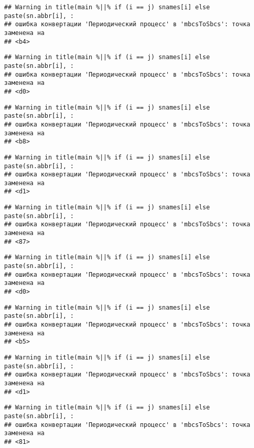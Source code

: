 \documentclass[
]{article}
\begin{document}
\begin{verbatim}
## Warning in title(main %||% if (i == j) snames[i] else paste(sn.abbr[i], :
## ошибка конвертации 'Периодический процесс' в 'mbcsToSbcs': точка заменена на
## <b4>
\end{verbatim}

\begin{verbatim}
## Warning in title(main %||% if (i == j) snames[i] else paste(sn.abbr[i], :
## ошибка конвертации 'Периодический процесс' в 'mbcsToSbcs': точка заменена на
## <d0>
\end{verbatim}

\begin{verbatim}
## Warning in title(main %||% if (i == j) snames[i] else paste(sn.abbr[i], :
## ошибка конвертации 'Периодический процесс' в 'mbcsToSbcs': точка заменена на
## <b8>
\end{verbatim}

\begin{verbatim}
## Warning in title(main %||% if (i == j) snames[i] else paste(sn.abbr[i], :
## ошибка конвертации 'Периодический процесс' в 'mbcsToSbcs': точка заменена на
## <d1>
\end{verbatim}

\begin{verbatim}
## Warning in title(main %||% if (i == j) snames[i] else paste(sn.abbr[i], :
## ошибка конвертации 'Периодический процесс' в 'mbcsToSbcs': точка заменена на
## <87>
\end{verbatim}

\begin{verbatim}
## Warning in title(main %||% if (i == j) snames[i] else paste(sn.abbr[i], :
## ошибка конвертации 'Периодический процесс' в 'mbcsToSbcs': точка заменена на
## <d0>
\end{verbatim}

\begin{verbatim}
## Warning in title(main %||% if (i == j) snames[i] else paste(sn.abbr[i], :
## ошибка конвертации 'Периодический процесс' в 'mbcsToSbcs': точка заменена на
## <b5>
\end{verbatim}

\begin{verbatim}
## Warning in title(main %||% if (i == j) snames[i] else paste(sn.abbr[i], :
## ошибка конвертации 'Периодический процесс' в 'mbcsToSbcs': точка заменена на
## <d1>
\end{verbatim}

\begin{verbatim}
## Warning in title(main %||% if (i == j) snames[i] else paste(sn.abbr[i], :
## ошибка конвертации 'Периодический процесс' в 'mbcsToSbcs': точка заменена на
## <81>
\end{verbatim}
\end{document}
